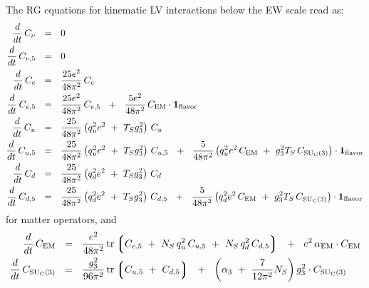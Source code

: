 \documentclass[12pt,preprintnumbers,nofootinbib]{revtex4}
\newcommand{\suc}{{{\rm SU}_{\rm C}(3)}}
\newcommand{\el}{{\rm EM}}
\newcommand{\uflavor}{\mathbf{1}_{\rm flavor}}
\newcommand{\lgr}{\left\lgroup}
\newcommand{\rgr}{\right\rgroup}
\begin{document}
%
%
	The RG equations for kinematic LV interactions below the EW scale read as:
\begin{align}
\label{RG_below_ferm}
\notag
	\frac{d}{dt}\, 
	C_\nu
	&
	~~=~~
	0
	\\
\notag
	\frac{d}{dt}\, 
	C_{\nu,5}
	&
	~~=~~
	0
	\\
\notag
	\frac{d}{dt}\, 
	C_e
	&
	~~=~~
	\frac{25 e^2}{48\pi^2}\,
	C_e 
	\\
\notag
	\frac{d}{dt}\, 
	C_{e,5}
	&
	~~=~~
	\frac{25 e^2}{48\pi^2}\,
	C_{e,5}
	~~+~~
	\frac{5 e^2}{48\pi^2}\, C_\el \cdot \uflavor
	\\
	\frac{d}{dt}\, 
	C_u
	&
	~~=~~
	\frac{25}{48\pi^2}
	\left( q_u^2 e^2 ~+~ T_S g_3^2 \right)\,
	C_u
	\\
\notag
	\frac{d}{dt}\, 
	C_{u,5}
	&
	~~=~~
	\frac{25}{48\pi^2}
	\left( q_u^2 e^2 ~+~ T_S g_3^2 \right)\,
	C_{u,5}
	~~+~~
	\frac{5}{48\pi^2} \left( q_u^2 e^2\, C_\el ~+~ g_3^2 T_S\, C_\suc \right)
	\cdot \uflavor
	\\
\notag
	\frac{d}{dt}\, 
	C_d
	&
	~~=~~
	\frac{25}{48\pi^2}
	\left( q_d^2 e^2 ~+~ T_S g_3^2 \right)\,
	C_d
	\\
\notag
	\frac{d}{dt}\, 
	C_{d,5}
	&
	~~=~~
	\frac{25}{48\pi^2}
	\left( q_d^2 e^2 ~+~ T_S g_3^2 \right)\,
	C_{d,5}
	~~+~~
	\frac{5}{48\pi^2} \left( q_d^2 e^2\, C_\el ~+~ g_3^2 T_S\, C_\suc \right)
	\cdot \uflavor
\end{align}
	for matter operators, and
\begin{align}
\label{RG_below_gauge}
\notag
	\frac{d}{dt}\, 
	C_\el
	&
	~~=~~
	\frac{e^2}{48\pi^2}\,
	{\rm tr}
	\lgr
		C_{e,5} ~+~
		N_S\, q_u^2 \, C_{u,5} ~+~
		N_S\, q_d^2 \, C_{d,5}
	\rgr
	~~+~~
	e^2 \,\alpha_\el \cdot C_\el
	\\
	\frac{d}{dt}\, 
	C_\suc
	&
	~~=~~
	\frac{g_3^2}{96\pi^2}\, {\rm tr} \lgr C_{u,5} ~+~ C_{d,5} \rgr
	~~+~~
	\left(
		\alpha_3  ~+~
		\frac{7}{12\pi^2} N_S 
	\right)g_3^2 \cdot
	C_\suc
\end{align}	
\end{document}
